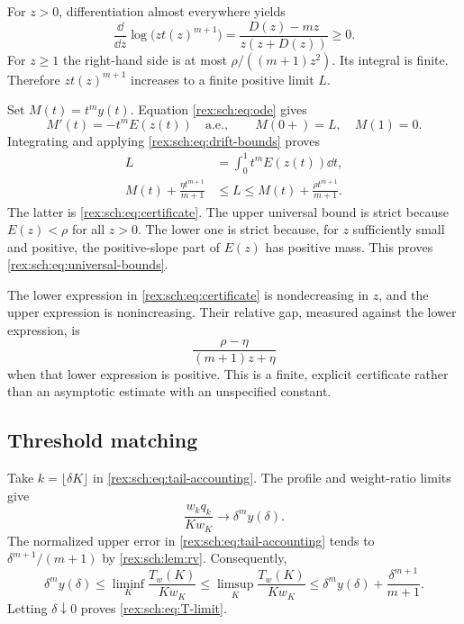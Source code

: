 For $z>0$, differentiation almost everywhere yields
\begin{equation}\label{rex:sch:eq:log-L-derivative}
 \frac{\dd}{\dd z}\log\bigl(z t(z)^{m+1}\bigr)
 =\frac{D(z)-mz}{z(z+D(z))}\geq0.
\end{equation}
For $z\geq1$ the right-hand side is at most
$\rho/((m+1)z^2)$. Its integral is finite. Therefore
$z t(z)^{m+1}$ increases to a finite positive limit $L$.

Set $M(t)=t^my(t)$. Equation \eqref{rex:sch:eq:ode} gives
\begin{equation}\label{rex:sch:eq:mass-derivative}
 M'(t)=-t^m E(z(t))\quad\text{a.e.},\qquad
 M(0+)=L,\quad M(1)=0.
\end{equation}
Integrating and applying \eqref{rex:sch:eq:drift-bounds} proves
\begin{align}
 L&=\int_0^1t^m E(z(t))\dd t,\label{rex:sch:eq:mass-integral}\\
 M(t)+\frac{\eta t^{m+1}}{m+1}
 &\leq L\leq M(t)+\frac{\rho t^{m+1}}{m+1}.
 \label{rex:sch:eq:time-certificate}
\end{align}
The latter is \eqref{rex:sch:eq:certificate}. The upper universal bound is
strict because $E(z)<\rho$ for all $z>0$. The lower one is strict
because, for $z$ sufficiently small and positive, the positive-slope
part of $E(z)$ has positive mass. This proves
\eqref{rex:sch:eq:universal-bounds}.

The lower expression in \eqref{rex:sch:eq:certificate} is nondecreasing in
$z$, and the upper expression is nonincreasing. Their relative gap,
measured against the lower expression, is
\begin{equation}\label{rex:sch:eq:certificate-gap}
 \frac{\rho-\eta}{(m+1)z+\eta}
\end{equation}
when that lower expression is positive. This is a finite, explicit
certificate rather than an asymptotic estimate with an unspecified
constant.

\subsection{Threshold matching}

Take $k=\lfloor\delta K\rfloor$ in \eqref{rex:sch:eq:tail-accounting}.
The profile and weight-ratio limits give
\[
 \frac{w_kq_k}{K w_K}\longrightarrow\delta^m y(\delta).
\]
The normalized upper error in \eqref{rex:sch:eq:tail-accounting} tends to
$\delta^{m+1}/(m+1)$ by \cref{rex:sch:lem:rv}. Consequently,
\[
 \delta^m y(\delta)
 \leq\liminf_K\frac{T_w(K)}{K w_K}
 \leq\limsup_K\frac{T_w(K)}{K w_K}
 \leq\delta^m y(\delta)+\frac{\delta^{m+1}}{m+1}.
\]
Letting $\delta\downarrow0$ proves \eqref{rex:sch:eq:T-limit}.

